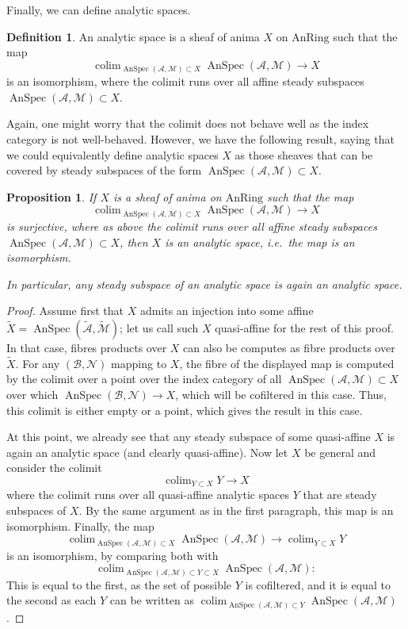 \documentclass[11pt]{amsbook}
\newcommand{\AnRing}{{\mathrm{AnRing}}}
\DeclareMathOperator{\AnSpec}{AnSpec}
\DeclareMathOperator{\colim}{colim}
\renewcommand*{\tilde}{\widetilde}
\numberwithin{equation}{section}
\numberwithin{theorem}{section}
\newtheorem{proposition}[theorem]{Proposition}
\theoremstyle{definition}
\newtheorem{definition}[theorem]{Definition}
\begin{document}
Finally, we can define analytic spaces.

\begin{definition} An analytic space is a sheaf of anima $X$ on $\AnRing$ such that the map
\[
\colim_{\AnSpec(\mathcal A,\mathcal M)\subset X} \AnSpec(\mathcal A,\mathcal M)\to X
\]
is an isomorphism, where the colimit runs over all affine steady subspaces $\AnSpec(\mathcal A,\mathcal M)\subset X$.
\end{definition}

Again, one might worry that the colimit does not behave well as the index category is not well-behaved. However, we have the following result, saying that we could equivalently define analytic spaces $X$ as those sheaves that can be covered by  steady subspaces of the form $\AnSpec(\mathcal A,\mathcal M)\subset X$.

\begin{proposition} If $X$ is a sheaf of anima on $\AnRing$ such that the map
\[
\colim_{\AnSpec(\mathcal A,\mathcal M)\subset X} \AnSpec(\mathcal A,\mathcal M)\to X
\]
is surjective, where as above the colimit runs over all affine steady subspaces $\AnSpec(\mathcal A,\mathcal M)\subset X$, then $X$ is an analytic space, i.e.~the map is an isomorphism.

In particular, any steady subspace of an analytic space is again an analytic space.
\end{proposition}

\begin{proof} Assume first that $X$ admits an injection into some affine $\tilde{X} = \AnSpec(\widetilde{\mathcal A},\widetilde{\mathcal M})$; let us call such $X$ quasi-affine for the rest of this proof. In that case, fibres products over $X$ can also be computes as fibre products over $\tilde{X}$. For any $(\mathcal B,\mathcal N)$ mapping to $X$, the fibre of the displayed map is computed by the colimit over a point over the index category of all $\AnSpec(\mathcal A,\mathcal M)\subset X$ over which $\AnSpec(\mathcal B,\mathcal N)\to X$, which will be cofiltered in this case. Thus, this colimit is either empty or a point, which gives the result in this case.

At this point, we already see that any steady subspace of some quasi-affine $X$ is again an analytic space (and clearly quasi-affine). Now let $X$ be general and consider the colimit
\[
\colim_{Y\subset X} Y\to X
\]
where the colimit runs over all quasi-affine analytic spaces $Y$ that are steady subspaces of $X$. By the same argument as in the first paragraph, this map is an isomorphism. Finally, the map
\[
\colim_{\AnSpec(\mathcal A,\mathcal M)\subset X} \AnSpec(\mathcal A,\mathcal M)\to \colim_{Y\subset X} Y
\]
is an isomorphism, by comparing both with
\[
\colim_{\AnSpec(\mathcal A,\mathcal M)\subset Y\subset X} \AnSpec(\mathcal A,\mathcal M):
\]
This is equal to the first, as the set of possible $Y$ is cofiltered, and it is equal to the second as each $Y$ can be written as $\colim_{\AnSpec(\mathcal A,\mathcal M)\subset Y} \AnSpec(\mathcal A,\mathcal M)$.
\end{proof}
\end{document}
